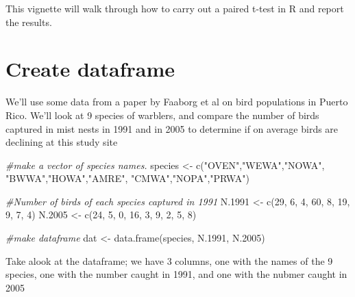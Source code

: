 \documentclass[
]{book}
\newenvironment{Shaded}{\begin{snugshade}}{\end{snugshade}}
\newcommand{\CommentTok}[1]{\textcolor[rgb]{0.56,0.35,0.01}{\textit{#1}}}
\newcommand{\DecValTok}[1]{\textcolor[rgb]{0.00,0.00,0.81}{#1}}
\newcommand{\FloatTok}[1]{\textcolor[rgb]{0.00,0.00,0.81}{#1}}
\newcommand{\FunctionTok}[1]{\textcolor[rgb]{0.00,0.00,0.00}{#1}}
\newcommand{\NormalTok}[1]{#1}
\newcommand{\OtherTok}[1]{\textcolor[rgb]{0.56,0.35,0.01}{#1}}
\newcommand{\StringTok}[1]{\textcolor[rgb]{0.31,0.60,0.02}{#1}}
\begin{document}
This vignette will walk through how to carry out a paired t-test in R and report the results.

\hypertarget{create-dataframe}{%
\section{Create dataframe}\label{create-dataframe}}

We'll use some data from a paper by Faaborg et al on bird populations in Puerto Rico. We'll look at 9 species of warblers, and compare the number of birds captured in mist nests in 1991 and in 2005 to determine if on average birds are declining at this study site

\begin{Shaded}
\begin{Highlighting}[]
\CommentTok{\#make a vector of species names.}
\NormalTok{species }\OtherTok{\textless{}{-}} \FunctionTok{c}\NormalTok{(}\StringTok{"OVEN"}\NormalTok{,}\StringTok{"WEWA"}\NormalTok{,}\StringTok{"NOWA"}\NormalTok{,}
             \StringTok{"BWWA"}\NormalTok{,}\StringTok{"HOWA"}\NormalTok{,}\StringTok{"AMRE"}\NormalTok{,}
             \StringTok{"CMWA"}\NormalTok{,}\StringTok{"NOPA"}\NormalTok{,}\StringTok{"PRWA"}\NormalTok{)}

\CommentTok{\#Number of birds of each species captured in 1991 }
\NormalTok{N}\FloatTok{.1991} \OtherTok{\textless{}{-}} \FunctionTok{c}\NormalTok{(}\DecValTok{29}\NormalTok{, }\DecValTok{6}\NormalTok{, }\DecValTok{4}\NormalTok{, }\DecValTok{60}\NormalTok{, }\DecValTok{8}\NormalTok{, }\DecValTok{19}\NormalTok{, }\DecValTok{9}\NormalTok{, }\DecValTok{7}\NormalTok{, }\DecValTok{4}\NormalTok{)}
\NormalTok{N}\FloatTok{.2005} \OtherTok{\textless{}{-}} \FunctionTok{c}\NormalTok{(}\DecValTok{24}\NormalTok{, }\DecValTok{5}\NormalTok{, }\DecValTok{0}\NormalTok{, }\DecValTok{16}\NormalTok{, }\DecValTok{3}\NormalTok{, }\DecValTok{9}\NormalTok{, }\DecValTok{2}\NormalTok{, }\DecValTok{5}\NormalTok{, }\DecValTok{8}\NormalTok{)}

\CommentTok{\#make dataframe}
\NormalTok{dat }\OtherTok{\textless{}{-}} \FunctionTok{data.frame}\NormalTok{(species,}
\NormalTok{                  N}\FloatTok{.1991}\NormalTok{,}
\NormalTok{                  N}\FloatTok{.2005}\NormalTok{)}
\end{Highlighting}
\end{Shaded}

Take alook at the dataframe; we have 3 columns, one with the names of the 9 species, one with the number caught in 1991, and one with the nubmer caught in 2005
\end{document}
